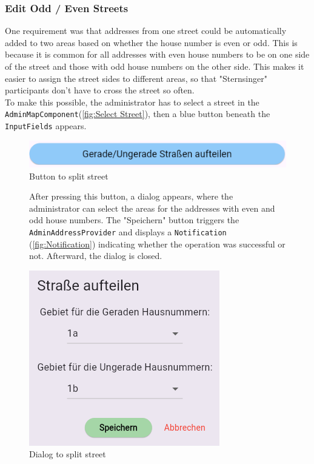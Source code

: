 \subsubsection{Edit Odd / Even Streets}
One requirement was that addresses from one street could be automatically added to two areas based on whether the house number is even or odd. This is because it is common for all addresses with even house numbers to be on one side of the street and those with odd house numbers on the other side. This makes it easier to assign the street sides to different areas, so that "Sternsinger" participants don't have to cross the street so often.\\ To make this possible, the administrator has to select a street in the \texttt{AdminMapComponent}(\ref{fig:Select Street}), then a blue button beneath the \texttt{InputFields} appears. \
\begin{figure}[H]
    \centering
    \includegraphics[width=0.7\linewidth]{images/AdminPanel/splitStreetButton.png}
    \caption{Button to split street}
\end{figure}

\begin{figure}[H] 
    \begin{minipage}{0.6\textwidth}
        After pressing this button, a dialog appears, where the administrator can select the areas for the addresses with even and odd house numbers. The "Speichern" button triggers the \texttt{AdminAddressProvider} and displays a \texttt{Notification} (\ref{fig:Notification}) indicating whether the operation was successful or not. Afterward, the dialog is closed.
    \end{minipage}
    \hfill
    \begin{minipage}{0.35\textwidth}
        \centering
        \includegraphics[width=\linewidth]{images/AdminPanel/splitStreetDialog.png}
        \caption{Dialog to split street}
    \end{minipage}
\end{figure}


